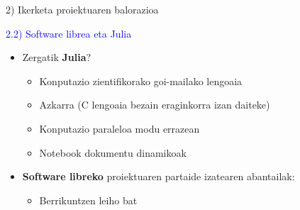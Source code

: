 \documentclass[
 10pt,%
 compress,%
 t,       %
 xcolor=svgnames
]{beamer}
\theoremstyle{definition} \newtheorem{definicion}{Definicion}[section]
\theoremstyle{propiedades} \newtheorem{propiedades}{Propiedades}[section]
\begin{document}
\begin{frame}{2) Ikerketa proiektuaren balorazioa} 	


%

\textcolor{blue}{2.2) Software librea eta Julia}

\medskip
\begin{itemize}

\medskip
%

\item Zergatik \textbf{Julia}?
%
\medskip
\begin{itemize}
	
	\item Konputazio zientifikorako goi-mailako  lengoaia
	
	
	\medskip
	\item Azkarra (C lengoaia bezain eraginkorra izan daiteke) 
	
	\medskip
	\item Konputazio paraleloa modu errazean
	
		\medskip
	\item Notebook dokumentu dinamikoak 
	
\end{itemize}

\bigskip

\item \textbf{Software libreko} proiektuaren partaide izatearen abantailak:

\medskip

\begin{itemize}

    \item Berrikuntzen leiho bat %
    	

\end{itemize}
\end{itemize}
\end{frame}
\end{document}
